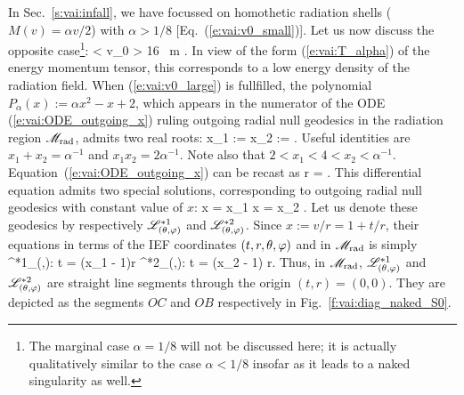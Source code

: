 In Sec.~\ref{s:vai:infall}, we have focussed on homothetic radiation shells
($M(v) = \alpha v / 2$) with
$\alpha > 1/8$ [Eq.~(\ref{e:vai:v0_small})].
Let us now discuss the opposite case\footnote{The marginal case $\alpha = 1/8$
will not be discussed here; it is actually qualitatively similar to the
case $\alpha < 1/8$ insofar as it leads to a naked singularity as well.}:
\be \label{e:vai:v0_large}
    \alpha <  \iff v_0 > 16 \, m .
\ee
In view of the form (\ref{e:vai:T_alpha}) of the energy momentum tensor, this
corresponds to a low energy density of the radiation field. When (\ref{e:vai:v0_large})
is fullfilled, the polynomial $P_\alpha(x) := \alpha x^2 - x + 2$, which appears in the
numerator of the ODE (\ref{e:vai:ODE_outgoing_x}) ruling outgoing radial null geodesics
in the radiation region $\mathscr{M}_{\rm rad}$,
admits two real roots:
\be \label{e:vai:x1_x2}
    x_1 := 
    \qand
    x_2 :=  .
\ee
Useful identities are $x_1 + x_2 = \alpha^{-1}$ and $x_1 x_2 = 2\alpha^{-1}$.
Note also that $2 < x_1 < 4 < x_2 < \alpha^{-1}$.
Equation~(\ref{e:vai:ODE_outgoing_x}) can be recast as
\be \label{e:vai:ODE_outgoing_x_naked}
    r  =  .
\ee
This differential equation admits two special solutions, corresponding
to outgoing radial null geodesics with constant value of $x$:
\be
    x = x_1  \qand x = x_2 .
\ee
Let us denote these geodesics by respectively
$\mathscr{L}^{*1}_{(\theta,\varphi)}$ and $\mathscr{L}^{*2}_{(\theta,\varphi)}$.
Since $x := v/r = 1 + t/r$, their equations in terms of the IEF
coordinates $(t, r, \theta, \varphi)$ and in $\mathscr{M}_{\rm rad}$ is simply
\be
    \Li^{*1}_{(\th,\ph)}: \quad t = (x_1 - 1)r
    \qand
    \Li^{*2}_{(\th,\ph)}: t = (x_2 - 1) r.
\ee
Thus, in $\mathscr{M}_{\rm rad}$,
$\mathscr{L}^{*1}_{(\theta,\varphi)}$ and $\mathscr{L}^{*2}_{(\theta,\varphi)}$ are straight line segments
through the origin $(t, r) = (0,0)$. They are depicted
as the segments $OC$ and $OB$ respectively in Fig.~\ref{f:vai:diag_naked_S0}.

